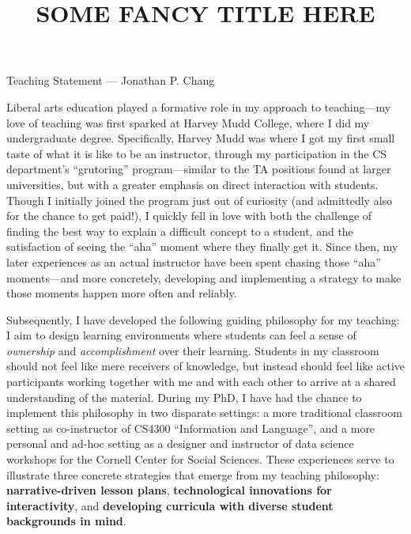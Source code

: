 \documentclass[11pt,letterpaper]{article}
\title{SOME FANCY TITLE HERE}
\begin{document}
\maketitle

\begin{center}
Teaching Statement --- Jonathan P. Chang
\end{center}

Liberal arts education played a formative role in my approach to teaching---my love of teaching was first sparked at Harvey Mudd College, where I did my undergraduate degree.
Specifically, Harvey Mudd was where I got my first small taste of what it is like to be an instructor, through my participation in the CS department's ``grutoring'' program---similar to the TA positions found at larger universities, but with a greater emphasis on direct interaction with students.
Though I initially joined the program just out of curiosity (and admittedly also for the chance to get paid!), I quickly fell in love with both the challenge of finding the best way to explain a difficult concept to a student, and the satisfaction of seeing the ``aha'' moment where they finally get it.
Since then, my later experiences as an actual instructor have been spent chasing those ``aha'' moments---and more concretely, developing and implementing a strategy to make those moments happen more often and reliably.

Subsequently, I have developed the following guiding philosophy for my teaching: I aim to design learning environments where students can feel a sense of \emph{ownership} and \emph{accomplishment} over their learning.
Students in my classroom should not feel like mere receivers of knowledge, but instead should feel like active participants working together with me and with each other to arrive at a shared understanding of the material.
During my PhD, I have had the chance to implement this philosophy in two disparate settings: a more traditional classroom setting as co-instructor of CS4300 ``Information and Language'', and a more personal and ad-hoc setting as a designer and instructor of data science workshops for the Cornell Center for Social Sciences.
These experiences serve to illustrate three concrete strategies that emerge from my teaching philosophy: \textbf{narrative-driven lesson plans}, \textbf{technological innovations for interactivity}, and \textbf{developing curricula with diverse student backgrounds in mind}.
\end{document}
